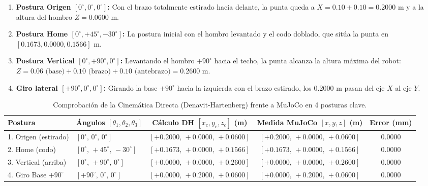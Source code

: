 \documentclass[11pt,a4paper]{article}
\begin{document}
\begin{enumerate}
    \item \textbf{Postura Origen $[0^\circ, 0^\circ, 0^\circ]$:} Con el brazo totalmente estirado hacia delante, la punta queda a $X = 0.10 + 0.10 = 0.2000\text{ m}$ y a la altura del hombro $Z = 0.0600\text{ m}$.
    \item \textbf{Postura Home $[0^\circ, +45^\circ, -30^\circ]$:} La postura inicial con el hombro levantado y el codo doblado, que sitúa la punta en $[0.1673, 0.0000, 0.1566]\text{ m}$.
    \item \textbf{Postura Vertical $[0^\circ, +90^\circ, 0^\circ]$:} Levantando el hombro $+90^\circ$ hacia el techo, la punta alcanza la altura máxima del robot: $Z = 0.06\text{ (base)} + 0.10\text{ (brazo)} + 0.10\text{ (antebrazo)} = 0.2600\text{ m}$.
    \item \textbf{Giro lateral $[+90^\circ, 0^\circ, 0^\circ]$:} Girando la base $+90^\circ$ hacia la izquierda con el brazo estirado, los $0.2000\text{ m}$ pasan del eje $X$ al eje $Y$.
\end{enumerate}

\begin{table}[H]
    \centering
    \caption{Comprobación de la Cinemática Directa (Denavit-Hartenberg) frente a MuJoCo en 4 posturas clave.}
    \label{tab:res_dh}
    \small
    \begin{tabular}{llccc}
        \toprule
        \textbf{Postura} & \textbf{Ángulos $[\theta_1, \theta_2, \theta_3]$} & \textbf{Cálculo DH $[x_c, y_c, z_c]$ (m)} & \textbf{Medida MuJoCo $[x, y, z]$ (m)} & \textbf{Error (mm)} \\
        \midrule
        1. Origen (estirado) & $[0^\circ,\, 0^\circ,\, 0^\circ]$ & $[+0.2000,\, +0.0000,\, +0.0600]$ & $[+0.2000,\, +0.0000,\, +0.0600]$ & $0.0000$ \\
        2. Home (codo) & $[0^\circ,\, +45^\circ,\, -30^\circ]$ & $[+0.1673,\, +0.0000,\, +0.1566]$ & $[+0.1673,\, +0.0000,\, +0.1566]$ & $0.0000$ \\
        3. Vertical (arriba) & $[0^\circ,\, +90^\circ,\, 0^\circ]$ & $[+0.0000,\, +0.0000,\, +0.2600]$ & $[+0.0000,\, +0.0000,\, +0.2600]$ & $0.0000$ \\
        4. Giro Base $+90^\circ$ & $[+90^\circ,\, 0^\circ,\, 0^\circ]$ & $[+0.0000,\, +0.2000,\, +0.0600]$ & $[+0.0000,\, +0.2000,\, +0.0600]$ & $0.0000$ \\
        \bottomrule
    \end{tabular}
\end{table}
\end{document}
